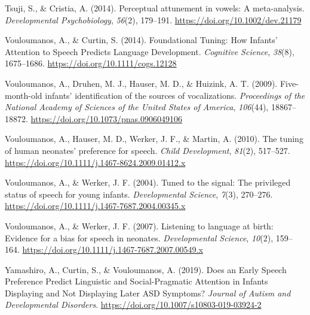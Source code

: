 \documentclass[man,floatsintext]{apa6}
\begin{document}
\leavevmode\hypertarget{ref-tsuji_perceptual_2014}{}%
Tsuji, S., \& Cristia, A. (2014). Perceptual attunement in vowels: A meta-analysis. \emph{Developmental Psychobiology}, \emph{56}(2), 179--191. \url{https://doi.org/10.1002/dev.21179}

\leavevmode\hypertarget{ref-vouloumanos_foundational_2014}{}%
Vouloumanos, A., \& Curtin, S. (2014). Foundational Tuning: How Infants' Attention to Speech Predicts Language Development. \emph{Cognitive Science}, \emph{38}(8), 1675--1686. \url{https://doi.org/10.1111/cogs.12128}

\leavevmode\hypertarget{ref-vouloumanos_five-month-old_2009}{}%
Vouloumanos, A., Druhen, M. J., Hauser, M. D., \& Huizink, A. T. (2009). Five-month-old infants' identification of the sources of vocalizations. \emph{Proceedings of the National Academy of Sciences of the United States of America}, \emph{106}(44), 18867--18872. \url{https://doi.org/10.1073/pnas.0906049106}

\leavevmode\hypertarget{ref-vouloumanos_tuning_2010}{}%
Vouloumanos, A., Hauser, M. D., Werker, J. F., \& Martin, A. (2010). The tuning of human neonates' preference for speech. \emph{Child Development}, \emph{81}(2), 517--527. \url{https://doi.org/10.1111/j.1467-8624.2009.01412.x}

\leavevmode\hypertarget{ref-vouloumanos_tuned_2004}{}%
Vouloumanos, A., \& Werker, J. F. (2004). Tuned to the signal: The privileged status of speech for young infants. \emph{Developmental Science}, \emph{7}(3), 270--276. \url{https://doi.org/10.1111/j.1467-7687.2004.00345.x}

\leavevmode\hypertarget{ref-vouloumanos_listening_2007}{}%
Vouloumanos, A., \& Werker, J. F. (2007). Listening to language at birth: Evidence for a bias for speech in neonates. \emph{Developmental Science}, \emph{10}(2), 159--164. \url{https://doi.org/10.1111/j.1467-7687.2007.00549.x}

\leavevmode\hypertarget{ref-yamashiro_does_2019}{}%
Yamashiro, A., Curtin, S., \& Vouloumanos, A. (2019). Does an Early Speech Preference Predict Linguistic and Social-Pragmatic Attention in Infants Displaying and Not Displaying Later ASD Symptoms? \emph{Journal of Autism and Developmental Disorders}. \url{https://doi.org/10.1007/s10803-019-03924-2}

\endgroup
\end{document}

